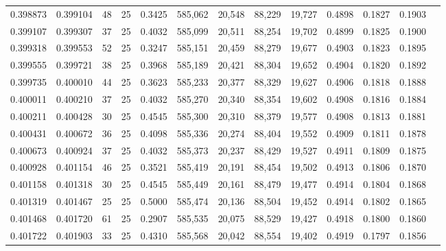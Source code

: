 \begin{tabular}{rrrrrrrrrrrrr}
0.398873 & 0.399104 &    48 &  25 &                                     0.3425 & 585,062 &  20,548 &  88,229 &  19,727 & 0.4898 & 0.1827 & 0.1903 \\
0.399107 & 0.399307 &    37 &  25 &                                     0.4032 & 585,099 &  20,511 &  88,254 &  19,702 & 0.4899 & 0.1825 & 0.1900 \\
0.399318 & 0.399553 &    52 &  25 &                                     0.3247 & 585,151 &  20,459 &  88,279 &  19,677 & 0.4903 & 0.1823 & 0.1895 \\
0.399555 & 0.399721 &    38 &  25 &                                     0.3968 & 585,189 &  20,421 &  88,304 &  19,652 & 0.4904 & 0.1820 & 0.1892 \\
0.399735 & 0.400010 &    44 &  25 &                                     0.3623 & 585,233 &  20,377 &  88,329 &  19,627 & 0.4906 & 0.1818 & 0.1888 \\
0.400011 & 0.400210 &    37 &  25 &                                     0.4032 & 585,270 &  20,340 &  88,354 &  19,602 & 0.4908 & 0.1816 & 0.1884 \\
0.400211 & 0.400428 &    30 &  25 &                                     0.4545 & 585,300 &  20,310 &  88,379 &  19,577 & 0.4908 & 0.1813 & 0.1881 \\
0.400431 & 0.400672 &    36 &  25 &                                     0.4098 & 585,336 &  20,274 &  88,404 &  19,552 & 0.4909 & 0.1811 & 0.1878 \\
0.400673 & 0.400924 &    37 &  25 &                                     0.4032 & 585,373 &  20,237 &  88,429 &  19,527 & 0.4911 & 0.1809 & 0.1875 \\
0.400928 & 0.401154 &    46 &  25 &                                     0.3521 & 585,419 &  20,191 &  88,454 &  19,502 & 0.4913 & 0.1806 & 0.1870 \\
0.401158 & 0.401318 &    30 &  25 &                                     0.4545 & 585,449 &  20,161 &  88,479 &  19,477 & 0.4914 & 0.1804 & 0.1868 \\
0.401319 & 0.401467 &    25 &  25 &                                     0.5000 & 585,474 &  20,136 &  88,504 &  19,452 & 0.4914 & 0.1802 & 0.1865 \\
0.401468 & 0.401720 &    61 &  25 &                                     0.2907 & 585,535 &  20,075 &  88,529 &  19,427 & 0.4918 & 0.1800 & 0.1860 \\
0.401722 & 0.401903 &    33 &  25 &                                     0.4310 & 585,568 &  20,042 &  88,554 &  19,402 & 0.4919 & 0.1797 & 0.1856 \\

\end{tabular}
